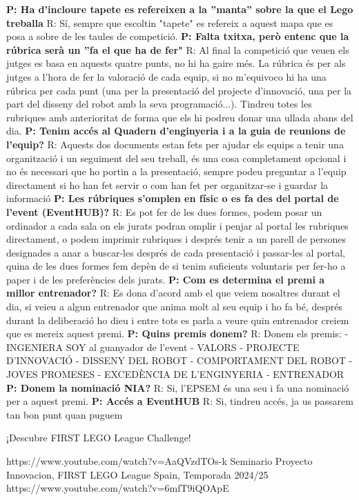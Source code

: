 \documentclass{article}
\begin{document}
\hfill \break\hfill \break
\textbf{P: Ha d’incloure tapete es refereixen a la ”manta” sobre la que el Lego treballa}
R: Sí, sempre que escoltin "tapete" es refereix a aquest mapa que es posa a sobre de les taules de competició.
\hfill \break\hfill \break
\textbf{P: Falta txitxa, però entenc que la rúbrica serà un ”fa el que ha de fer"}
R: Al final la competició que veuen els jutges es basa en aquests quatre punts, no hi ha gaire més. La rúbrica és per als jutges a l'hora de fer la valoració de cada equip, si no m'equivoco hi ha una rúbrica per cada punt (una per la presentació del projecte d'innovació, una per la part del disseny del robot amb la seva programació...). Tindreu totes les rubriques amb anterioritat de forma que els hi podreu donar una ullada abans del dia.
\hfill \break\hfill \break
\textbf{P: Tenim accés al Quadern d'enginyeria i a la guia de reunions de l'equip?}
R: Aquests dos documents estan fets per ajudar els equips a tenir una organització i un seguiment del seu treball, és una cosa completament opcional i no és necessari que ho portin a la presentació, sempre podeu preguntar a l'equip directament si ho han fet servir o com han fet per organitzar-se i guardar la informació
\hfill \break\hfill \break
\textbf{P: Les rúbriques s'omplen en físic o es fa des del portal de l'event (EventHUB)?}
R: Es pot fer de les dues formes, podem posar un ordinador a cada sala on els jurats podran omplir i penjar al portal les rubriques directament, o podem imprimir rubriques i després tenir a un parell de persones designades a anar a buscar-les després de cada presentació i passar-les al portal, quina de les dues formes fem depèn de si tenim suficients voluntaris per fer-ho a paper i de les preferències dels jurats.
\hfill \break\hfill \break
\textbf{P: Com es determina el premi a millor entrenador?}
R: Es dona d'acord amb el que veiem nosaltres durant el dia, si veieu a algun entrenador que anima molt al seu equip i ho fa bé, després durant la deliberació ho dieu i entre tots es parla a veure quin entrenador creiem que es mereix aquest premi.
\hfill \break\hfill \break
\textbf{P: Quins premis donem?}
R: Donem els premis:
     -  INGENIERA SOY al guanyador de l'event
     -  VALORS
     -  PROJECTE D'INNOVACIÓ
     -  DISSENY DEL ROBOT
     -  COMPORTAMENT DEL ROBOT
     -  JOVES PROMESES
     -  EXCEDÈNCIA DE L'ENGINYERIA
     -  ENTRENADOR
     \hfill \break\hfill \break
\textbf{P: Donem la nominació NIA?}
R: Si, l'EPSEM és una seu i fa una nominació per a aquest premi.
\hfill \break\hfill \break
\textbf{P: Accés a EventHUB}
R: Si, tindreu accés, ja us passarem tan bon punt quan puguem
\hfill \break\hfill \break
\begin{thebibliography}{9}

¡Descubre FIRST LEGO League Challenge!

https://www.youtube.com/watch?v=AaQVzdTOs-k
Seminario Proyecto Innovacion, FIRST LEGO League Spain, Temporada 2024/25  
https://www.youtube.com/watch?v=6mfT9iQOApE

\end{thebibliography}
\end{document}

